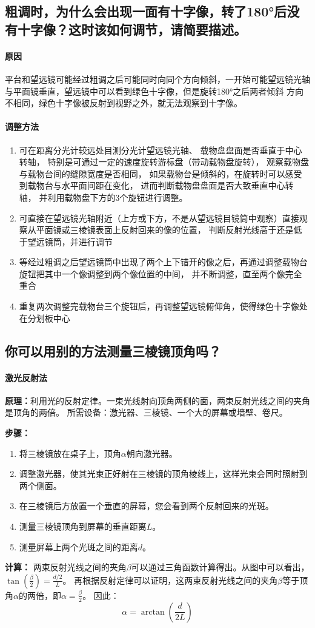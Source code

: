 \documentclass{../template/Report}%
\begin{document}
  \subsection{粗调时，为什么会出现一面有十字像，转了\ang{180}后没有十字像？这时该如何调节，请简要描述。}
\paragraph{原因} 平台和望远镜可能经过粗调之后可能同时向同个方向倾斜，一开始可能望远镜光轴与平面镜垂直，望远镜中可以看到绿色十字像，但是旋转\ang{180}之后两者倾斜
方向不相同，绿色十字像被反射到视野之外，就无法观察到十字像。
\paragraph{调整方法}
\begin{enumerate}
  \item 可在距离分光计较远处目测分光计望远镜光轴、
  载物盘盘面是否垂直于中心转轴，
  特别是可通过一定的速度旋转游标盘（带动载物盘旋转），
  观察载物盘与载物台间的缝隙宽度是否相同，
  如果载物台是倾斜的，在旋转时可以感受到载物台与水平面间距在变化，
  进而判断载物盘盘面是否大致垂直中心转轴，
  并利用载物盘下方的3个旋钮进行调整。
  \item 可直接在望远镜光轴附近（上方或下方，不是从望远镜目镜筒中观察）直接观察从平面镜或三棱镜表面上反射回来的像的位置，
  判断反射光线高于还是低于望远镜筒，并进行调节
  \item 等经过粗调之后望远镜筒中出现了两个上下错开的像之后，再通过调整载物台旋钮把其中一个像调整到两个像位置的中间，
  并不断调整，直至两个像完全重合
  \item 重复两次调整完载物台三个旋钮后，再调整望远镜俯仰角，使得绿色十字像处在分划板中心
\end{enumerate}
\subsection{你可以用别的方法测量三棱镜顶角吗？}
\paragraph{激光反射法}
\textbf{原理：}利用光的反射定律。一束光线射向顶角两侧的面，两束反射光线之间的夹角是顶角的两倍。
所需设备：激光器、三棱镜、一个大的屏幕或墙壁、卷尺。

\textbf{步骤：}

\begin{enumerate}[label=\textbf{Step }\arabic{*}.]
  \item 将三棱镜放在桌子上，顶角$\alpha$朝向激光器。
  \item 调整激光器，使其光束正好射在三棱镜的顶角棱线上，这样光束会同时照射到两个侧面。
  \item 在三棱镜后方放置一个垂直的屏幕，您会看到两个反射回来的光斑。
  \item 测量三棱镜顶角到屏幕的垂直距离$L$。
  \item 测量屏幕上两个光斑之间的距离$d$。
\end{enumerate}

\textbf{计算：}
两束反射光线之间的夹角$\beta$可以通过三角函数计算得出。从图中可以看出，$ \tan(\frac{\beta}{2}) = \frac{d/2}{L} $。
再根据反射定律可以证明，这两束反射光线之间的夹角$\beta$等于顶角$\alpha$的两倍，即$\alpha = \frac{\beta}{2}$。
因此：
\[
\alpha = \arctan(\frac{d}{2L})
\]
\insertnotes
\end{document}
